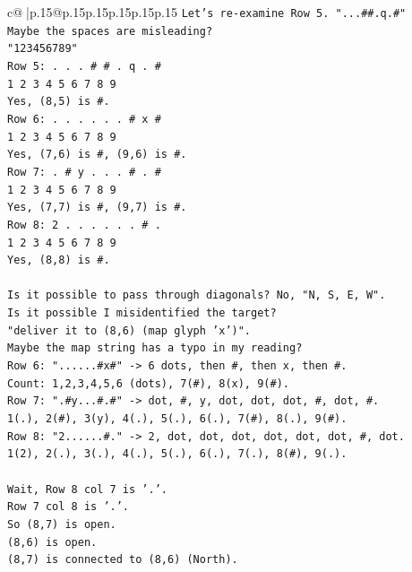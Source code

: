 \documentclass{article}
\begin{document}
{\begin{supertabular}{c@{$\;$}|p{.15\linewidth}@{}p{.15\linewidth}p{.15\linewidth}p{.15\linewidth}p{.15\linewidth}p{.15\linewidth}}
{{{\texttt{Let's re{-}examine Row 5. "...\#\#.q.\#"} \\
\texttt{Maybe the spaces are misleading?} \\
\texttt{"123456789"} \\
\texttt{Row 5: . . . \# \# . q . \#} \\
\texttt{1 2 3 4 5 6 7 8 9} \\
\texttt{Yes, (8,5) is \#.} \\
\texttt{Row 6: . . . . . . \# x \#} \\
\texttt{1 2 3 4 5 6 7 8 9} \\
\texttt{Yes, (7,6) is \#, (9,6) is \#.} \\
\texttt{Row 7: . \# y . . . \# . \#} \\
\texttt{1 2 3 4 5 6 7 8 9} \\
\texttt{Yes, (7,7) is \#, (9,7) is \#.} \\
\texttt{Row 8: 2 . . . . . . \# .} \\
\texttt{1 2 3 4 5 6 7 8 9} \\
\texttt{Yes, (8,8) is \#.} \\
\\ 
\texttt{Is it possible to pass through diagonals? No, "N, S, E, W".} \\
\texttt{Is it possible I misidentified the target?} \\
\texttt{"deliver it to (8,6) (map glyph 'x')".} \\
\texttt{Maybe the map string has a typo in my reading?} \\
\texttt{Row 6: "......\#x\#" {-}> 6 dots, then \#, then x, then \#.} \\
\texttt{Count: 1,2,3,4,5,6 (dots), 7(\#), 8(x), 9(\#).} \\
\texttt{Row 7: ".\#y...\#.\#" {-}> dot, \#, y, dot, dot, dot, \#, dot, \#.} \\
\texttt{1(.), 2(\#), 3(y), 4(.), 5(.), 6(.), 7(\#), 8(.), 9(\#).} \\
\texttt{Row 8: "2......\#." {-}> 2, dot, dot, dot, dot, dot, dot, \#, dot.} \\
\texttt{1(2), 2(.), 3(.), 4(.), 5(.), 6(.), 7(.), 8(\#), 9(.).} \\
\\ 
\texttt{Wait, Row 8 col 7 is '.'.} \\
\texttt{Row 7 col 8 is '.'.} \\
\texttt{So (8,7) is open.} \\
\texttt{(8,6) is open.} \\
\texttt{(8,7) is connected to (8,6) (North).} \\
}}}
\end{supertabular}}
\end{document}
